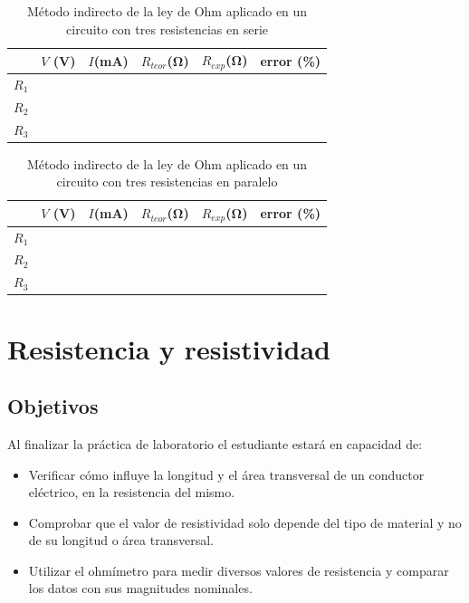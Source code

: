 \documentclass[12pt,letterpaper]{report}
\newcommand{\obj}{Objetivos}
\begin{document}
\begin{table}[H]
	\caption{Método indirecto de la ley de Ohm aplicado en un circuito con tres resistencias en serie}
	\label{tab:L1T3}
	\centering
	\vspace{0.5cm}
    \begin{tabularx}{14cm}{CCCCCC}
		\toprule
		& $V$ (\si{V}) & $I$(\si{\milli\ampere}) & $R_{teor}$(\si{\ohm}) & $R_{exp}$(\si{\ohm}) & error (\%)\\
		\midrule
		$R_1$ & & & & & \\
		$R_2$ & & & & & \\
		$R_3$ & & & & & \\
		\bottomrule
	\end{tabularx}
\end{table}

\begin{table}[H]
	\caption{Método indirecto de la ley de Ohm aplicado en un circuito con tres resistencias en paralelo}
	\label{tab:L1T4}
	\centering
	\vspace{0.5cm}
    \begin{tabularx}{14cm}{CCCCCC}
		\toprule
		&$V$ (\si{V}) & $I$(\si{\milli\ampere}) & $R_{teor}$(\si{\ohm}) & $R_{exp}$(\si{\ohm}) & error (\%)\\
		\midrule
		$R_1$ & & & & & \\
		$R_2$ & & & & & \\
		$R_3$ & & & & & \\
		\bottomrule
	\end{tabularx}
\end{table}

\chapter{Resistencia y resistividad}
\section{\obj}
Al finalizar la práctica de laboratorio el estudiante estará en capacidad de:
\begin{itemize}
\item Verificar cómo influye la longitud y el área transversal de un conductor eléctrico, en la resistencia del mismo.
\item	Comprobar que el valor de resistividad solo depende del tipo de material y no de su longitud o área transversal.
\item	Utilizar el ohmímetro para medir diversos valores de resistencia y comparar los datos con sus magnitudes nominales.
\end{itemize}
\end{document}
